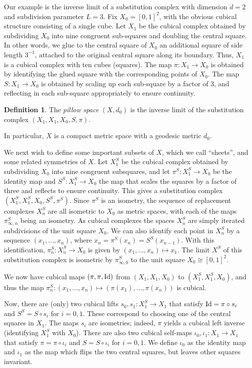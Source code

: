 \documentclass{amsart}
\theoremstyle{plain}
\theoremstyle{definition}
\newtheorem{definition}[theorem]{Definition}
\numberwithin{equation}{section}
\numberwithin{theorem}{section}
\begin{document}
Our example is the inverse limit of a substitution complex with dimension $d=2$ and subdivision parameter $L=3$. Fix $X_0 = [0,1]^2$, with the obvious cubical structure consisting of a single cube. Let $X_1$ be the cubical complex obtained by subdividing $X_0$ into nine congruent sub-squares and doubling the central square. In other words, we glue to the central square of $X_0$ an additional square of side length $3^{-1}$, attached to the original central square along its boundary. Thus, $X_1$ is a cubical complex with ten cubes (squares). The map $\pi:X_1\to X_0$ is obtained by identifying the glued square with the corresponding points of $X_0$. The map $S:X_1\to X_0$ is obtained by scaling up each sub-square by a factor of $3$, and reflecting in each sub-square appropriately to ensure continuity. 

\begin{definition}\label{def:pillowspace}
The \textit{pillow space} $(X,d_0)$ is the inverse limit of the substitution complex $(X_1, X_1, X_0, S, \pi)$.  
\end{definition}
In particular, $X$ is a compact metric space with a geodesic metric $d_0$.

We next wish to define some important subsets of $X$, which we call ``sheets'', and some related symmetries of $X$. Let $X_1^S$ be the cubical complex obtained by subdividing $X_0$ into nine congruent subsquares, and let $\pi^S\colon X_1^S\to X_0$ be the identity map and $S^S\colon X_1^S\to X_0$ the map that scales the squares by a factor of three and reflects to ensure continuity. This gives a substitution complex $(X_1^S, X_1^S, X_0, S^S, \pi^S)$. Since $\pi^S$ is an isometry, the sequence of replacement complexes $X_n^S$ are all isometric to $X_0$ as metric spaces, with each of the maps $\pi^S_{\infty,n}$ being an isometry. As cubical complexes the spaces $X^S_n$ are simply iterated subdivisions of the unit square $X_0$. We can also identify each point in $X_n^S$ by a sequence $(x_1,\dots, x_n)$, where $x_n =\pi^S(x_n)= S^S(x_{n-1})$. With this identification, $\pi_n^S:X_n^S \to X_0$ is given by $(x_1,\dots, x_n)\mapsto x_1$. The limit $X^S$ of this substitution complex is isometric by $\pi^S_{\infty,0}$ to the unit square $X_0\cong [0,1]^2$. 

We now have cubical maps $(\pi,\pi,{\rm Id})$ from $(X_1,X_1,X_0)$ to $(X_1^S, X_1^S, X_0)$, and thus the map $\pi_n^S: (x_1, \dots, x_n)\mapsto (\pi(x_1), \dots, \pi(x_n))$ is cubical. 

Now, there are (only) two cubical lifts $s_0,s_1:X_1^S\to X_1$ that satisfy ${\rm Id}=\pi\circ s_i$ and $S^S = S \circ s_i$ for $i=0,1$. These correspond to choosing one of the central squares in $X_1$. The maps $s_i$ are isometries; indeed, $\pi$ yields a cubical left inverse (identifying $X_1^S$ with $X_0$). There are also two cubical self-maps $\iota_0, \iota_1:X_1\to X_1$ that satisfy $\pi = \pi \circ \iota_i$ and $S = S \circ \iota_i$ for $i=0,1$. We define $\iota_0$ as the identity map and $\iota_1$ as the map which flips the two central squares, but leaves other squares invariant.
\end{document}
